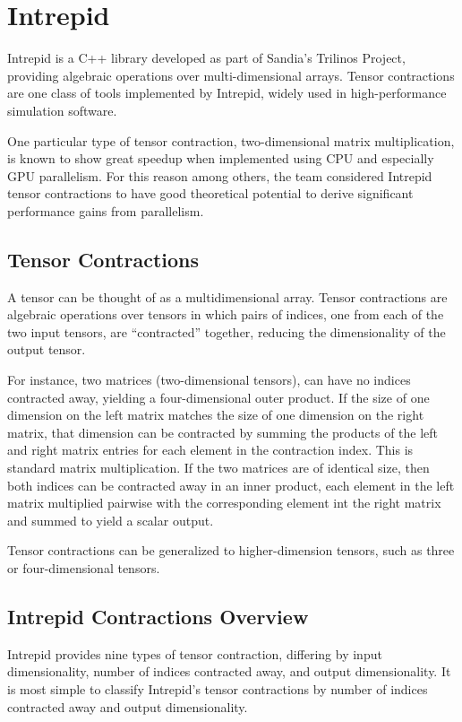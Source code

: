 \chapter{Intrepid}
Intrepid is a C++ library developed as part of Sandia's Trilinos Project,
providing algebraic operations over multi-dimensional arrays.  Tensor
contractions are one class of tools implemented by Intrepid, widely used in
high-performance simulation software.

One particular type of tensor contraction, two-dimensional matrix
multiplication, is known to show great speedup when implemented using CPU and
especially GPU parallelism.  For this reason among others, the team considered
Intrepid tensor contractions to have good theoretical potential to derive
significant performance gains from parallelism.

\section{Tensor Contractions}
A tensor can be thought of as a multidimensional array.  Tensor contractions are
algebraic operations over tensors in which pairs of indices, one from each of
the two input tensors, are ``contracted'' together, reducing the dimensionality
of the output tensor.  

For instance, two matrices (two-dimensional tensors), can have no indices
contracted away, yielding a four-dimensional outer product.  If the size of one
dimension on the left matrix matches the size of one dimension on the right
matrix, that dimension can be contracted by summing the products of the left and
right matrix entries for each element in the contraction index.  This is
standard matrix multiplication.  If the two matrices are of identical size, then
both indices can be contracted away in an inner product, each element in the
left matrix multiplied pairwise with the corresponding element int the right
matrix and summed to yield a scalar output.

Tensor contractions can be generalized to higher-dimension tensors, such as
three or four-dimensional tensors.

\section{Intrepid Contractions Overview}
Intrepid provides nine types of tensor contraction, differing by input
dimensionality, number of indices contracted away, and output dimensionality.
It is most simple to classify Intrepid's tensor contractions by number of
indices contracted away and output dimensionality.

